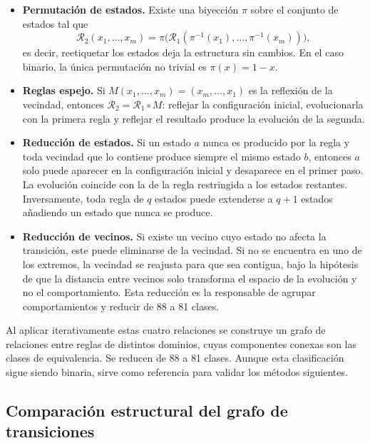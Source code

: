 \begin{itemize}
	\item \textbf{Permutación de estados.} Existe una biyección $\pi$ sobre el conjunto de estados tal que
	\[
	\mathcal{R}_2(x_1, \dots, x_m) = \pi\bigl(\mathcal{R}_1(\pi^{-1}(x_1), \dots, \pi^{-1}(x_m))\bigr),
	\]
	es decir, reetiquetar los estados deja la estructura sin cambios. En el caso binario, la única permutación no trivial es $\pi(x) = 1 - x$.
	
	\item \textbf{Reglas espejo.} Si $M(x_1, \dots, x_m) = (x_m, \dots, x_1)$ es la reflexión de la vecindad, entonces $\mathcal{R}_2 = \mathcal{R}_1 \circ M$: reflejar la configuración inicial, evolucionarla con la primera regla y reflejar el resultado produce la evolución de la segunda.
	
	\item \textbf{Reducción de estados.} Si un estado $a$ nunca es producido por la regla y toda vecindad que lo contiene produce siempre el mismo estado $b$, entonces $a$ solo puede aparecer en la configuración inicial y desaparece en el primer paso. La evolución coincide con la de la regla restringida a los estados restantes. Inversamente, toda regla de $q$ estados puede extenderse a $q + 1$ estados añadiendo un estado que nunca se produce.
	
	\item \textbf{Reducción de vecinos.} Si existe un vecino cuyo estado no afecta la transición, este puede eliminarse de la vecindad. Si no se encuentra en uno de los extremos, la vecindad se reajusta para que sea contigua, bajo la hipótesis de que la distancia entre vecinos solo transforma el espacio de la evolución y no el comportamiento. Esta reducción es la responsable de agrupar comportamientos y reducir de 88 a 81 clases.
\end{itemize}

Al aplicar iterativamente estas cuatro relaciones se construye un grafo de relaciones entre reglas de distintos dominios, cuyas componentes conexas son las clases de equivalencia. Se reducen de 88 a 81 clases. Aunque esta clasificación sigue siendo binaria, sirve como referencia para validar los métodos siguientes.

\subsection{Comparación estructural del grafo de transiciones}

